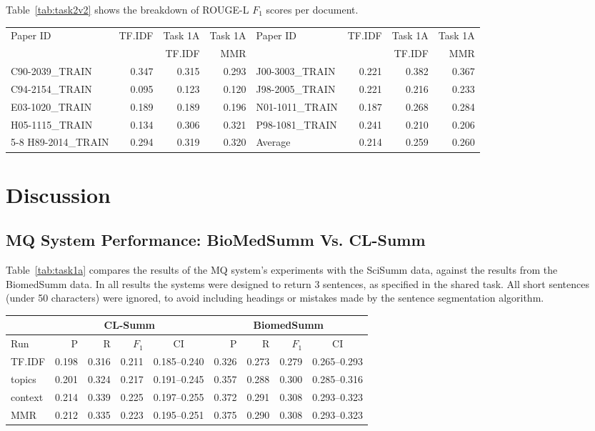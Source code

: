 \documentclass[11pt]{article}
\begin{document}
Table~\ref{tab:task2v2} shows the breakdown of ROUGE-L $F_1$ scores per
document.

\begin{table*}
  \centering
  \begin{tabular}{|l|r|r|r||l|r|r|r|}
  \hline
	Paper ID & TF.IDF & Task 1A  & Task 1A & 	Paper ID & TF.IDF & Task 1A  & Task 1A  \\
			&	& TF.IDF & MMR & 	&	& TF.IDF & MMR \\
	\hline
	C90-2039\_TRAIN & 0.347 & 0.315 & 0.293 &	J00-3003\_TRAIN & 0.221 & 0.382 & 0.367\\
	C94-2154\_TRAIN & 0.095 & 0.123 & 0.120 & 	J98-2005\_TRAIN & 0.221 & 0.216 & 0.233\\
	E03-1020\_TRAIN & 0.189 & 0.189 & 0.196 &	N01-1011\_TRAIN & 0.187 & 0.268 & 0.284\\
	H05-1115\_TRAIN & 0.134 & 0.306 & 0.321 & 	P98-1081\_TRAIN & 0.241 & 0.210 & 0.206\\
\cline{5-8}
	H89-2014\_TRAIN & 0.294 & 0.319 & 0.320 &	Average & 0.214 & 0.259 & 0.260 \\
	\hline
  \end{tabular}
  \caption{ROUGE-L $F_1$ results for summaries generated by the MQ system.}
  \label{tab:task2v2}
\end{table*}

\section{Discussion}
\vspace{-.3cm}
\subsection{MQ System Performance: BioMedSumm Vs. CL-Summ}
Table~\ref{tab:task1a} compares the results of the MQ system's experiments with 
the SciSumm data, against the results from the BiomedSumm data. In all results 
the systems were designed to return 3 sentences, as specified in the shared task.
 All short sentences (under 50 characters) were ignored, to avoid including 
 headings or mistakes made by the sentence segmentation algorithm.

\begin{table*}
  \centering
  \begin{tabular}{|l|r|r|r|c|r|r|r|c|}
  	\hline
	& \multicolumn{4}{|c|}{CL-Summ} & \multicolumn{4}{|c|}{BiomedSumm}\\
	\hline
	Run & P & R & $F_1$ & CI & P & R & $F_1$ & CI\\
	\hline
    TF.IDF & 0.198 & 0.316 & 0.211 & 0.185--0.240 & 0.326 & 0.273 & 0.279 & 0.265--0.293\\
	topics & 0.201 & 0.324 & 0.217 & 0.191--0.245 & 0.357 & 0.288 & 0.300
	& 0.285--0.316\\
	context & 0.214 & 0.339 & 0.225 & 0.197--0.255 & 0.372 & 0.291 & 0.308
	& 0.293--0.323\\
	MMR & 0.212 & 0.335 & 0.223 & 0.195--0.251 &  0.375 & 0.290 & 0.308 & 0.293--0.323\\ 
	\hline
  \end{tabular}
  \caption{ROUGE-L results of the MQ system runs for Task 1A.}
  \label{tab:task1amq}
\end{table*}
\end{document}
